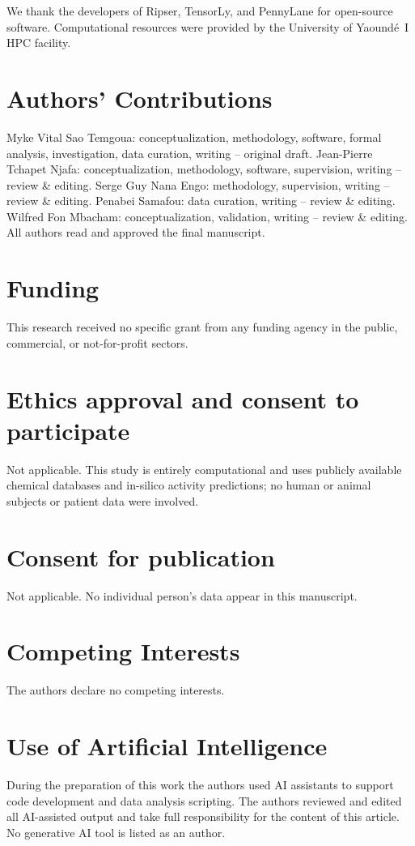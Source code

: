 \documentclass[11pt,a4paper]{article}
\begin{document}
We thank the developers of Ripser, TensorLy, and PennyLane for open-source software. Computational resources were provided by the University of Yaound\'{e}~I HPC facility.

\section*{Authors' Contributions}

Myke Vital Sao Temgoua: conceptualization, methodology, software, formal analysis, investigation, data curation, writing -- original draft. Jean-Pierre Tchapet Njafa: conceptualization, methodology, software, supervision, writing -- review \& editing. Serge Guy Nana Engo: methodology, supervision, writing -- review \& editing. Penabei Samafou: data curation, writing -- review \& editing. Wilfred Fon Mbacham: conceptualization, validation, writing -- review \& editing. All authors read and approved the final manuscript.

\section*{Funding}

This research received no specific grant from any funding agency in the public, commercial, or not-for-profit sectors.

\section*{Ethics approval and consent to participate}

Not applicable. This study is entirely computational and uses publicly available chemical databases and in-silico activity predictions; no human or animal subjects or patient data were involved.

\section*{Consent for publication}

Not applicable. No individual person's data appear in this manuscript.

\section*{Competing Interests}

The authors declare no competing interests.

\section*{Use of Artificial Intelligence}

During the preparation of this work the authors used AI assistants to support code development and data analysis scripting. The authors reviewed and edited all AI-assisted output and take full responsibility for the content of this article. No generative AI tool is listed as an author.




\end{document}
